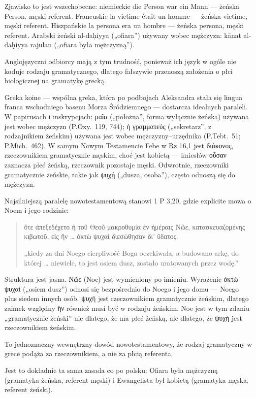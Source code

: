 Zjawisko to jest wszechobecne:
niemieckie die Person war ein Mann — żeńska Person, męski referent.
Francuskie la victime était un homme — żeńska victime, męski referent.
Hiszpańskie la persona era un hombre — żeńska persona, męski referent.
Arabski żeński al-daḥiyya („ofiara”) używany wobec mężczyzn:
kānat al-daḥiyya rajulan („ofiara była mężczyzną”).

Anglojęzyczni odbiorcy mają z tym trudność, ponieważ ich język w ogóle nie koduje rodzaju gramatycznego, dlatego fałszywie przenoszą założenia o płci biologicznej na gramatykę grecką.

Greka koine — wspólna greka, która po podbojach Aleksandra stała się lingua franca wschodniego basenu Morza Śródziemnego — dostarcza idealnych paraleli.
W papirusach i inskrypcjach: μαῖα („położna”, forma wyłącznie żeńska) używana jest wobec mężczyzn (P.Oxy.\ 119, 744); ἡ γραμματεύς („sekretarz”, z rodzajnikiem żeńskim) używana jest wobec mężczyzny–urzędnika (P.Tebt.\ 51; P.Mich.\ 462).
W samym Nowym Testamencie Febe w Rz 16,1 jest διάκονος, rzeczownikiem gramatycznie męskim, choć jest kobietą — imiesłów οὖσαν zaznacza płeć żeńską, rzeczownik pozostaje męski.
Odwrotnie, rzeczowniki gramatycznie żeńskie, takie jak ψυχή („dusza, osoba”), często odnoszą się do mężczyzn.

Najsilniejszą paralelę nowotestamentową stanowi 1 P 3,20, gdzie explicite mowa o Noem i jego rodzinie:

\begin{quote}
ὅτε ἀπεξεδέχετο ἡ τοῦ Θεοῦ μακροθυμία ἐν ἡμέραις Νῶε, κατασκευαζομένης κιβωτοῦ, εἰς ἣν \ldots{} ὀκτὼ ψυχαὶ διεσώθησαν δι' ὕδατος.

„kiedy za dni Noego cierpliwość Boga oczekiwała, a budowano arkę, do której \ldots{} niewiele, to jest osiem dusz, zostało uratowanych przez wodę.”
\end{quote}

Struktura jest jasna.
Νῶε (Noe) jest wymieniony po imieniu.
Wyrażenie ὀκτὼ ψυχαί („osiem dusz”) odnosi się bezpośrednio do Noego i jego domu — Noego plus siedem innych osób.
ψυχή jest rzeczownikiem gramatycznie żeńskim, dlatego zaimek względny ἣν również musi być w rodzaju żeńskim.
Noe jest w tym zdaniu „gramatycznie żeński” nie dlatego, że ma płeć żeńską, ale dlatego, że ψυχή jest rzeczownikiem żeńskim.

To jednoznaczny wewnętrzny dowód nowotestamentowy, że rodzaj gramatyczny w grece podąża za rzeczownikiem, a nie za płcią referenta.

Jest to dokładnie ta sama zasada co po polsku:
Ofiara była mężczyzną (gramatyka żeńska, referent męski) i Ewangelista był kobietą (gramatyka męska, referent żeński).

